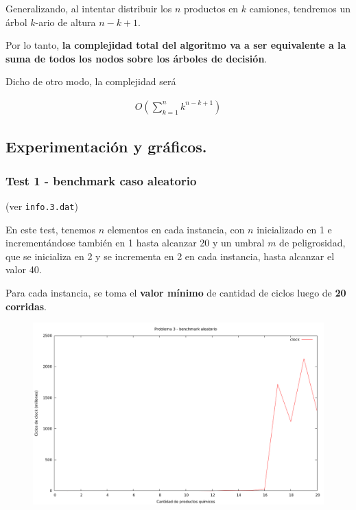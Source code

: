 Generalizando, al intentar distribuir los $n$ productos en $k$
camiones, tendremos un árbol $k$-ario de altura $n - k + 1$.

Por lo tanto, \textbf{la complejidad total del algoritmo va a ser equivalente a la
suma de todos los nodos sobre los árboles de decisión}.

Dicho de otro modo, la complejidad será

\begin{align*}
  O(\sum_{k=1}^n k^{n - k + 1})
\end{align*}

\vspace*{0.75cm} \noindent


\newpage
\subsection{Experimentación y gráficos.}

\vspace*{0.3cm}

\subsubsection{Test 1 - benchmark caso aleatorio}

(ver \verb|info.3.dat|) \medskip

En este test, tenemos $n$ elementos en cada instancia, con $n$ inicializado en 1 e incrementándose
también en 1 hasta alcanzar 20 y un umbral $m$ de peligrosidad, que se inicializa en 2 y se incrementa
en 2 en cada instancia, hasta alcanzar el valor 40.

Para cada instancia, se toma el \textbf{valor mínimo} de cantidad de ciclos luego de \textbf{20 corridas}.

\vspace*{0.5cm}

\begin{figure}[h]
  \begin{center}
    \includegraphics[scale=0.35]{imagenes/grafico-3.png}
  \end{center}
\end{figure}

